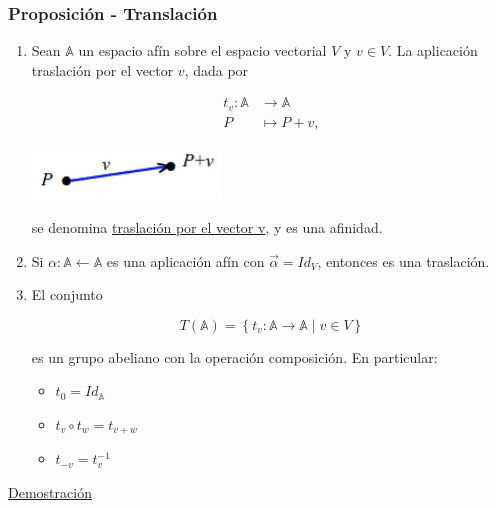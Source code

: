\documentclass[12pt, a4paper, ones, notitlepage, openany,titlepage]{article}
\newcommand{\demostracion}{\noindent\underline{Demostración}}
\begin{document}
\subsubsection{Proposición - Translación}
\begin{enumerate}[label=(\arabic*)]
\item Sean $\mathbb{A}$ un espacio afín sobre el espacio vectorial $V$ y $v \in V$. La aplicación traslación por el vector $v$, dada por

$$
\begin{aligned}
t_{v}: \mathbb{A} & \longrightarrow \mathbb{A} \\
P & \longmapsto P+v,
\end{aligned}
$$

\begin{center}
\includegraphics[max width=5cm]{2023_03_01_7659aec5e35f9a9b2d3cg-22}
\end{center}

se denomina \underline{traslación por el vector v}, y es una afinidad.

\item Si $\alpha:\mathbb{A}\longleftarrow\mathbb{A}$ es una aplicación afín con $\vec{\alpha}=Id_{V}$, entonces es una traslación.

\item El conjunto

$$
T(\mathbb{A})=\left\{t_{v}: \mathbb{A} \rightarrow \mathbb{A} \mid v \in V\right\}
$$

es un grupo abeliano con la operación composición. En particular:
\begin{itemize}
\item $t_{0} = Id_{\mathbb{A}}$
\item $t_{v}\circ t_{w} = t_{v+w}$
\item $t_{-v} = t_{v}^{-1}$
\end{itemize}

\end{enumerate}
\demostracion
\end{document}
